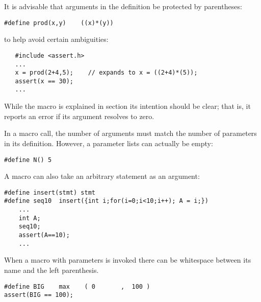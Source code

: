 	It is advisable that arguments in the definition be protected 
	by parentheses:

\begin{production}
\begin{verbatim}
#define prod(x,y)    ((x)*(y))
\end{verbatim}
\end{production}

to help avoid certain ambiguities:

\begin{production}
\begin{verbatim}
   #include <assert.h>
   ...
   x = prod(2+4,5);    // expands to x = ((2+4)*(5));
   assert(x == 30);
   ...
\end{verbatim}
\end{production}

While the macro  is explained in section
 its intention should be clear; that is, it reports an error if
its argument resolves to zero.

In a macro call, the number of arguments must match the number of
parameters in its definition. However, a parameter lists can actually be empty:

\begin{production}
\begin{verbatim}
#define N() 5
\end{verbatim}
\end{production}

A macro can also take an arbitrary statement as an argument:
\begin{production}
\begin{verbatim}
#define insert(stmt) stmt
#define seq10  insert({int i;for(i=0;i<10;i++); A = i;})
    ...   
    int A;
    seq10;
    assert(A==10);
    ...
\end{verbatim}
\end{production}



 When a macro with parameters is invoked there can be
 whitespace between its name and the left parenthesis. 

\begin{production}
\begin{verbatim}
#define BIG    max    ( 0       ,  100 )
assert(BIG == 100);
\end{verbatim}
\end{production}

